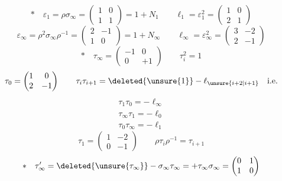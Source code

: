 \[
*\quad\varepsilon_1=\rho\sigma_\infty=\begin{pmatrix}1&0\\1&1\end{pmatrix}=1+N_1\qquad
\ell_1=\varepsilon_1^2=\begin{pmatrix}1&0\\2&1\end{pmatrix}
\]
\[
\varepsilon_\infty=\rho^2\sigma_\infty\rho^{-1}=\begin{pmatrix}2&-1\\1&0\end{pmatrix}=1+N_\infty\qquad
\ell_\infty=\varepsilon_\infty^2=\begin{pmatrix}3&-2\\2&-1\end{pmatrix}
\]
\[
*\quad\tau_\infty=\begin{pmatrix}-1&0\\0&+1\end{pmatrix}\qquad\tau_i^2=1
\]
\[
\tau_0=\begin{pmatrix}1&0\\2&-1\end{pmatrix}\qquad
\tau_i\tau_{i+1}=\deleted{\unsure{1}}-\ell_{\unsure{i+2|i+1}}\quad\text{i.e.}
\]
\[
\begin{gathered}\tau_1\tau_0=-\ell_\infty\\\tau_\infty\tau_1=-\ell_0\\\tau_0\tau_\infty=-\ell_1\end{gathered}
\]
\[
\tau_1=\begin{pmatrix}1&-2\\0&-1\end{pmatrix}\qquad\rho\tau_i\rho^{-1}=\tau_{i+1}
\]
\[
*\quad\tau'_\infty=\deleted{\unsure{\tau_\infty}}-\sigma_\infty\tau_\infty=+\tau_\infty\sigma_\infty=\begin{pmatrix}0&1\\1&0\end{pmatrix}
\]
